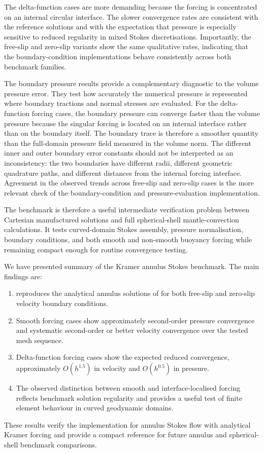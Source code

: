 \documentclass[gmd, manuscript]{copernicus}
\begin{document}
The delta-function cases are more demanding because the forcing is concentrated
on an internal circular interface. The slower convergence rates are consistent
with the reference  solutions and with the expectation that pressure is
especially sensitive to reduced regularity in mixed Stokes discretisations.
Importantly, the free-slip and zero-slip variants show the same qualitative
rates, indicating that the  boundary-condition implementations behave
consistently across both benchmark families.

The boundary pressure results provide a complementary diagnostic to the volume
pressure error. They test how accurately the numerical pressure is represented
where boundary tractions and normal stresses are evaluated. For the
delta-function forcing cases, the boundary pressure can converge faster than
the volume pressure because the singular forcing is located on an internal
interface rather than on the boundary itself. The boundary trace is therefore a
smoother quantity than the full-domain pressure field measured in the volume
norm. The different inner and outer boundary error constants should not be
interpreted as an inconsistency: the two boundaries have different radii,
different geometric quadrature paths, and different distances from the internal
forcing interface. Agreement in the observed trends across free-slip and
zero-slip cases is the more relevant check of the boundary-condition and
pressure-evaluation implementation.

The benchmark is therefore a useful intermediate verification problem between
Cartesian manufactured solutions and full spherical-shell mantle-convection
calculations. It tests curved-domain Stokes assembly, pressure normalisation,
boundary conditions, and both smooth and non-smooth buoyancy forcing while
remaining compact enough for routine convergence testing.

\conclusions

We have presented summary of the  Kramer annulus Stokes
benchmark. The main findings are:
\begin{enumerate}
  \item {} reproduces the analytical annulus solutions of 
  for both free-slip and zero-slip velocity boundary conditions.
  \item Smooth forcing cases show approximately second-order pressure
  convergence and systematic second-order or better velocity convergence over
  the tested mesh sequence.
  \item Delta-function forcing cases show the expected reduced convergence,
  approximately \(O(h^{1.5})\) in velocity and \(O(h^{0.5})\) in pressure.
  \item The observed distinction between smooth and interface-localised forcing
  reflects benchmark solution regularity and provides a useful test of finite
  element behaviour in curved geodynamic domains.
\end{enumerate}

These results verify the  implementation for annulus Stokes flow
with analytical Kramer forcing and provide a compact reference for future
annulus and spherical-shell benchmark comparisons.



\end{document}
